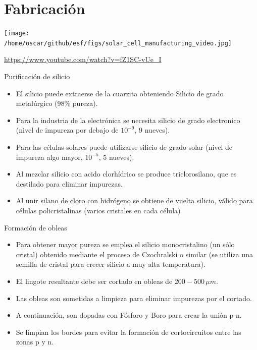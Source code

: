 \documentclass[xcolor={usenames,svgnames,dvipsnames}]{beamer}
\begin{document}
\section{Fabricación}
\label{sec:org7350f9c}

\begin{frame}[label={sec:orgc0b5a71}]{}
\begin{center}
\texttt{[image: /home/oscar/github/esf/figs/solar\_cell\_manufacturing\_video.jpg]}
\end{center}

\url{https://www.youtube.com/watch?v=fZ1SC-vUe_I}
\end{frame}

\begin{frame}[label={sec:org900705a}]{Purificación de silicio}
\begin{itemize}
\item El silicio puede extraerse de la cuarzita obteniendo Silicio de grado metalúrgico (98\% pureza).

\item Para la industria de la electrónica se necesita silicio de grado electronico (nivel de impureza por debajo de \(10^{-9}\), 9 nueves).

\item Para las células solares puede utilizarse silicio de grado solar (nivel de impureza algo mayor, \(10^{-5}\), 5 nueves).

\item Al mezclar silicio con acido clorhídrico se produce triclorosilano, que es destilado para eliminar impurezas.

\item Al unir silano de cloro con hidrógeno se obtiene de vuelta silicio, válido para células policristalinas (varios cristales en cada célula)
\end{itemize}
\end{frame}

\begin{frame}[label={sec:org0808da1}]{Formación de obleas}
\begin{itemize}
\item Para obtener mayor pureza se emplea el silicio monocristalino (un sólo cristal) obtenido mediante el proceso de Czochralski o similar (se utiliza una semilla de cristal para crecer silicio a muy alta temperatura).

\item El lingote resultante debe ser cortado en obleas de \(200-500\,\mu m\).

\item Las obleas son sometidas a limpieza para eliminar impurezas por el cortado.

\item A continuación, son dopadas con Fósforo y Boro para crear la unión p-n.

\item Se limpian los bordes para evitar la formación de cortocircuitos entre las zonas p y n.
\end{itemize}
\end{frame}
\end{document}
